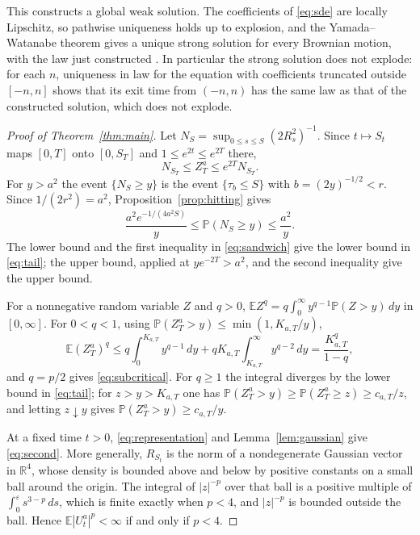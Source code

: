\documentclass[11pt]{amsart}
\theoremstyle{remark}
\newcommand{\E}{\mathbb E}
\newcommand{\Pp}{\mathbb P}
\newcommand{\R}{\mathbb R}
\begin{document}
This constructs a global weak solution. The coefficients of \eqref{eq:sde} are locally Lipschitz, so pathwise uniqueness holds up to explosion, and the Yamada--Watanabe theorem gives a unique strong solution for every Brownian motion, with the law just constructed \cite[Chapter~IX]{RY99}. In particular the strong solution does not explode: for each $n$, uniqueness in law for the equation with coefficients truncated outside $[-n,n]$ shows that its exit time from $(-n,n)$ has the same law as that of the constructed solution, which does not explode.

\begin{proof}[Proof of Theorem~\ref{thm:main}]
Let $N_S=\sup_{0\le s\le S}(2R_s^2)^{-1}$. Since $t\mapsto S_t$ maps $[0,T]$ onto $[0,S_T]$ and $1\le e^{2t}\le e^{2T}$ there,
\begin{equation}\label{eq:sandwich}
 N_{S_T}\le Z_T^a\le e^{2T}N_{S_T}.
\end{equation}
For $y>a^2$ the event $\{N_S\ge y\}$ is the event $\{\tau_b\le S\}$ with $b=(2y)^{-1/2}<r$. Since $1/(2r^2)=a^2$, Proposition~\ref{prop:hitting} gives
\[
 \frac{a^2e^{-1/(4a^2S)}}{y}\le\Pp(N_S\ge y)\le\frac{a^2}{y}.
\]
The lower bound and the first inequality in \eqref{eq:sandwich} give the lower bound in \eqref{eq:tail}; the upper bound, applied at $ye^{-2T}>a^2$, and the second inequality give the upper bound.

For a nonnegative random variable $Z$ and $q>0$, $\E Z^q=q\int_0^\infty y^{q-1}\Pp(Z>y)\,dy$ in $[0,\infty]$. For $0<q<1$, using $\Pp(Z_T^a>y)\le\min(1,K_{a,T}/y)$,
\[
 \E(Z_T^a)^q\le q\int_0^{K_{a,T}}y^{q-1}\,dy+qK_{a,T}\int_{K_{a,T}}^\infty y^{q-2}\,dy=\frac{K_{a,T}^q}{1-q},
\]
and $q=p/2$ gives \eqref{eq:subcritical}. For $q\ge1$ the integral diverges by the lower bound in \eqref{eq:tail}; for $z>y>K_{a,T}$ one has $\Pp(Z_T^a>y)\ge\Pp(Z_T^a\ge z)\ge c_{a,T}/z$, and letting $z\downarrow y$ gives $\Pp(Z_T^a>y)\ge c_{a,T}/y$.

At a fixed time $t>0$, \eqref{eq:representation} and Lemma~\ref{lem:gaussian} give \eqref{eq:second}. More generally, $R_{S_t}$ is the norm of a nondegenerate Gaussian vector in $\R^4$, whose density is bounded above and below by positive constants on a small ball around the origin. The integral of $|z|^{-p}$ over that ball is a positive multiple of $\int_0^\varepsilon s^{3-p}\,ds$, which is finite exactly when $p<4$, and $|z|^{-p}$ is bounded outside the ball. Hence $\E|U_t^a|^p<\infty$ if and only if $p<4$.
\end{proof}
\end{document}
